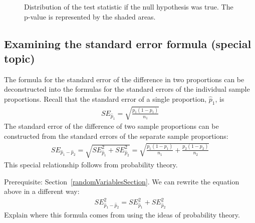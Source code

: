 \begin{figure}[h]
  \centering
  \caption{Distribution of the test statistic if the null
      hypothesis was true.
      The p-value is represented by the shaded areas.}
  \label{bladesTwoSampleHTPValueQC}
\end{figure}


\D{\newpage}

\subsection{Examining the standard error formula (special topic)}

The formula for the standard error of the difference
in two proportions can be deconstructed into the formulas
for the standard errors of the individual sample proportions.
Recall that the standard error of a single proportion,
$\hat{p}_1$, is
\begin{align*}
SE_{\hat{p}_1} = \sqrt{\frac{{p}_1 (1 - {p}_1)}{n_1}}
\end{align*}
The standard error of the difference of two sample proportions
can be constructed from the standard errors of the separate
sample proportions:
\begin{align*}
SE_{\hat{p}_{1} - \hat{p}_{2}}
	= \sqrt{SE_{\hat{p}_1}^2 + SE_{\hat{p}_2}^2}
	= \sqrt{\frac{{p}_1 (1 - {p}_1)}{n_1}
	    + \frac{{p}_2 (1 - {p}_2)}{n_2}}
\end{align*}
This special relationship follows from probability theory.

\begin{exercisewrap}
\begin{nexercise}
\label{derivingSEForDiffOfTwoMeansExercise}%
Prerequisite: Section~\ref{randomVariablesSection}.
We can rewrite the equation above in a different way:
\begin{align*}
SE_{\hat{p}_{1} - \hat{p}_{2}}^2
  = SE_{\hat{p}_1}^2 + SE_{\hat{p}_2}^2
\end{align*}
Explain where this formula comes from using the ideas of probability theory.\footnotemark{}
\end{nexercise}
\end{exercisewrap}



